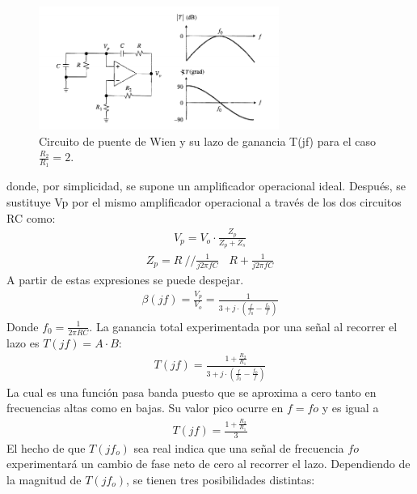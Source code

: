 \begin{figure}[H]
	\centering
	\includegraphics[width=0.7\textwidth]{Imagenes-Ej1/102.png}
	\caption{Circuito de puente de Wien y su lazo de ganancia T(jf) para el caso $\frac{R_2}{R_1} =2$. }
		\label{fig:wienbasico}
\end{figure}
donde, por simplicidad, se supone un amplificador operacional ideal. Después, se sustituye Vp por el mismo amplificador operacional a través de los dos circuitos RC como:
\begin{align}
V_p= V_o \cdot \frac{Z_p}{Z_p+Z_s}
\end{align}
\begin{align}
Z_p= R \ // \frac{1}{j2\pi f C} \ \ \ \ R + \frac{1}{j2\pi f C} 
\end{align}
A partir de estas expresiones se puede despejar.
\begin{align}
\beta (jf)=\frac{V_p}{V_o}=\frac{1}{3+j\cdot \left( \frac{f}{f_0}-\frac{f_0}{f} \right) }
\end{align}
Donde $f_0 = \frac{1}{2\pi RC}$. La ganancia total experimentada por una señal al recorrer el lazo es
$T(jf)=A \cdot B$:
 \begin{align}
T (jf)=\frac{1+\frac{R_2}{R_1}}{3+j\cdot \left( \frac{f}{f_0}-\frac{f_0}{f} \right) }
\end{align}
La cual es una función pasa banda puesto que se aproxima a cero tanto en frecuencias altas
como en bajas. Su valor pico ocurre en $f= fo$ y es igual a
 \begin{align}
T (jf)=\frac{1+\frac{R_2}{R_1}}{3}
\label{eq:107}
\end{align}
El hecho de que $T(jf_o)$ sea real indica que una señal de frecuencia $fo$ experimentará un
cambio de fase neto de cero al recorrer el lazo. Dependiendo de la magnitud de $T(jf_o)$, se
tienen tres posibilidades distintas: 
